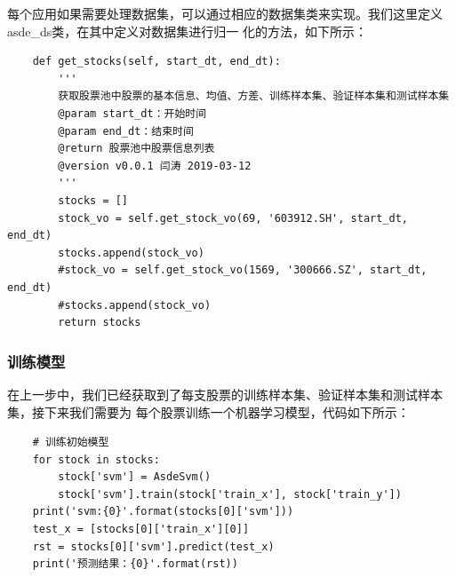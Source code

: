 \documentclass{article}
\begin{document}
每个应用如果需要处理数据集，可以通过相应的数据集类来实现。我们这里定义asde\_ds类，在其中定义对数据集进行归一
化的方法，如下所示：
\begin{lstlisting}
    def get_stocks(self, start_dt, end_dt):
        '''
        获取股票池中股票的基本信息、均值、方差、训练样本集、验证样本集和测试样本集
        @param start_dt：开始时间
        @param end_dt：结束时间
        @return 股票池中股票信息列表
        @version v0.0.1 闫涛 2019-03-12
        '''
        stocks = []
        stock_vo = self.get_stock_vo(69, '603912.SH', start_dt, end_dt)
        stocks.append(stock_vo)
        #stock_vo = self.get_stock_vo(1569, '300666.SZ', start_dt, end_dt)
        #stocks.append(stock_vo)
        return stocks
\end{lstlisting}
\subsubsection{训练模型}
在上一步中，我们已经获取到了每支股票的训练样本集、验证样本集和测试样本集，接下来我们需要为
每个股票训练一个机器学习模型，代码如下所示：
\begin{lstlisting}
    # 训练初始模型
    for stock in stocks:
        stock['svm'] = AsdeSvm()
        stock['svm'].train(stock['train_x'], stock['train_y'])
    print('svm:{0}'.format(stocks[0]['svm']))
    test_x = [stocks[0]['train_x'][0]]
    rst = stocks[0]['svm'].predict(test_x)
    print('预测结果：{0}'.format(rst))
\end{lstlisting}
\end{document}
